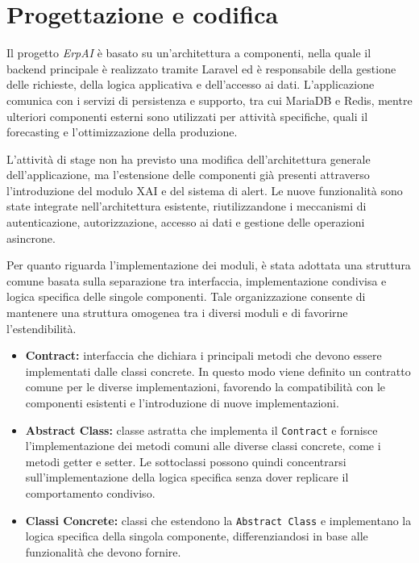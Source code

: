 \chapter{Progettazione e codifica}
\label{chap:progettazione-codifica}

Il progetto \textit{ErpAI} è basato su un'architettura a componenti, nella quale il backend principale è realizzato tramite Laravel ed è responsabile della gestione delle richieste, 
della logica applicativa e dell'accesso ai dati. L'applicazione comunica con i servizi di persistenza e supporto, tra cui MariaDB e Redis, mentre ulteriori componenti esterni 
sono utilizzati per attività specifiche, quali il forecasting e l'ottimizzazione della produzione.

L'attività di stage non ha previsto una modifica dell'architettura generale dell'applicazione, ma l'estensione delle componenti già presenti attraverso l'introduzione del modulo 
XAI e del sistema di alert. Le nuove funzionalità sono state integrate nell'architettura esistente, riutilizzandone i meccanismi di autenticazione, autorizzazione, accesso ai dati 
e gestione delle operazioni asincrone.

Per quanto riguarda l'implementazione dei moduli, è stata adottata una struttura comune basata sulla separazione tra interfaccia, implementazione condivisa e logica specifica delle singole componenti. Tale organizzazione consente di mantenere una struttura omogenea tra i diversi moduli e di favorirne l'estendibilità.

\begin{itemize}
  \item \textbf{Contract:} interfaccia che dichiara i principali metodi che devono essere implementati dalle classi concrete. In questo modo viene definito un contratto 
    comune per le diverse implementazioni, favorendo la compatibilità con le componenti esistenti e l'introduzione di nuove implementazioni.
  \item \textbf{Abstract Class:} classe astratta che implementa il \texttt{Contract} e fornisce l'implementazione dei metodi comuni alle diverse classi concrete, come i metodi 
    getter e setter. Le sottoclassi possono quindi concentrarsi sull'implementazione della logica specifica senza dover replicare il comportamento condiviso.
  \item \textbf{Classi Concrete:} classi che estendono la \texttt{Abstract Class} e implementano la logica specifica della singola componente, differenziandosi in base alle 
    funzionalità che devono fornire.
\end{itemize}


